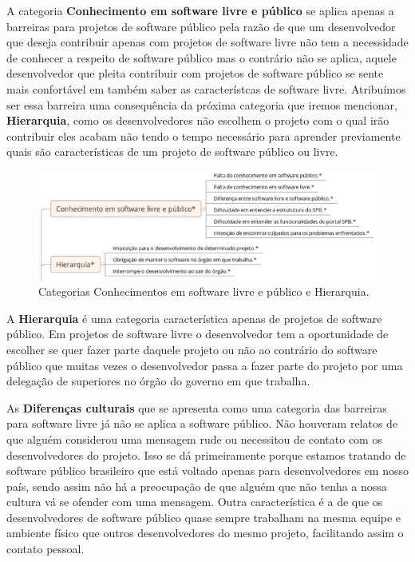 A categoria \textbf{Conhecimento em software livre e público} se aplica apenas a
barreiras para projetos de software público pela razão de que um desenvolvedor 
que deseja contribuir apenas com projetos de software livre não tem a necessidade 
de conhecer a respeito de software público mas o contrário não se aplica, aquele 
desenvolvedor que pleita contribuir com projetos de software público se sente
mais confortável em também saber as característcas de software livre. Atribuímos
ser essa barreira uma consequência da próxima categoria que iremos mencionar, 
\textbf{Hierarquia}, como os desenvolvedores não escolhem o projeto com o qual irão
contribuir eles acabam não tendo o tempo necessário para aprender previamente quais
são características de um projeto de software público ou livre.

\begin{figure}[h]
	\centering
	\label{fig:conhecimentos}
		\includegraphics[keepaspectratio=true,scale=0.5]{figuras/conhecimentos.eps}
	\caption{Categorias Conhecimentos em software livre e público e Hierarquia.}
\end{figure}

A \textbf{Hierarquia} é uma categoria característica apenas de projetos de
software público. Em projetos de software livre o desenvolvedor tem a oportunidade
de escolher se quer fazer parte daquele projeto ou não ao contrário do software
público que muitas vezes o desenvolvedor passa a fazer parte do projeto por
uma delegação de superiores no órgão do governo em que trabalha.

As \textbf{Diferenças culturais} que se apresenta como uma categoria das barreiras
para software livre já não se aplica a software público. Não houveram relatos de que alguém 
considerou uma mensagem rude ou necessitou de contato com os desenvolvedores do projeto.
Isso se dá primeiramente porque estamos tratando de software público brasileiro que 
está voltado apenas para desenvolvedores em nosso país, sendo assim
não há a preocupação de que alguém que não tenha a nossa cultura vá se ofender com uma 
mensagem. Outra característica é a de que os desenvolvedores de software público quase
sempre trabalham na mesma equipe e ambiente físico que outros desenvolvedores do mesmo 
projeto, facilitando assim o contato pessoal.

